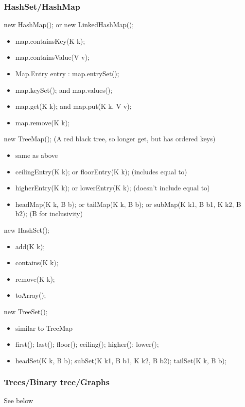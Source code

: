 \documentclass[10pt]{article}
\begin{document}
\subsubsection{HashSet/HashMap}
new HashMap(); or new LinkedHashMap();
\begin{itemize}
    \item map.containsKey(K k);
    \item map.containsValue(V v);
    \item Map.Entry entry : map.entrySet();
    \item map.keySet(); and map.values();
    \item map.get(K k); and map.put(K k, V v);
    \item map.remove(K k);
\end{itemize}
new TreeMap(); (A red black tree, so longer get, but has ordered keys)
\begin{itemize}
    \item same as above
    \item ceilingEntry(K k); or floorEntry(K k); (includes equal to)
    \item higherEntry(K k); or lowerEntry(K k); (doesn't include equal to)
    \item headMap(K k, B b); or tailMap(K k, B b); or subMap(K k1, B b1, K k2, B b2); (B for inclusivity)
\end{itemize}
new HashSet();
\begin{itemize}
    \item add(K k);
    \item contains(K k);
    \item remove(K k);
    \item toArray();
\end{itemize}
new TreeSet();
\begin{itemize}
    \item similar to TreeMap
    \item first(); last(); floor(); ceiling(); higher(); lower();
    \item headSet(K k, B b); subSet(K k1, B b1, K k2, B b2); tailSet(K k, B b);
\end{itemize}
\subsubsection{Trees/Binary tree/Graphs}
See below
\end{document}
